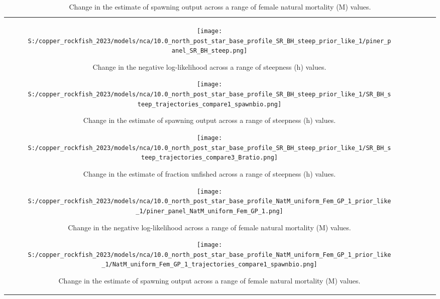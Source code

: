 \documentclass[11pt,
  letterpaper,
]{article}
\begin{document}
\begin{longtable}[t]{c>{\centering\arraybackslash}p{2cm}>{\centering\arraybackslash}p{2cm}>{\centering\arraybackslash}p{2cm}}
\pagebreak

\begin{figure}
{\centering
\texttt{[image: S:/copper\_rockfish\_2023/models/nca/10.0\_north\_post\_star\_base\_profile\_SR\_BH\_steep\_prior\_like\_1/piner\_panel\_SR\_BH\_steep.png]}
}
\caption{Change in the negative log-likelihood across a range of steepness (h) values.\label{fig:h-profile}}
\end{figure}

\pagebreak

\begin{figure}
{\centering
\texttt{[image: S:/copper\_rockfish\_2023/models/nca/10.0\_north\_post\_star\_base\_profile\_SR\_BH\_steep\_prior\_like\_1/SR\_BH\_steep\_trajectories\_compare1\_spawnbio.png]}
}
\caption{Change in the estimate of spawning output across a range of steepness (h) values.\label{fig:h-ssb}}
\end{figure}

\pagebreak

\begin{figure}
{\centering
\texttt{[image: S:/copper\_rockfish\_2023/models/nca/10.0\_north\_post\_star\_base\_profile\_SR\_BH\_steep\_prior\_like\_1/SR\_BH\_steep\_trajectories\_compare3\_Bratio.png]}
}
\caption{Change in the estimate of fraction unfished across a range of steepness (h) values.\label{fig:h-depl}}
\end{figure}

\pagebreak

\begin{figure}
{\centering
\texttt{[image: S:/copper\_rockfish\_2023/models/nca/10.0\_north\_post\_star\_base\_profile\_NatM\_uniform\_Fem\_GP\_1\_prior\_like\_1/piner\_panel\_NatM\_uniform\_Fem\_GP\_1.png]}
}
\caption{Change in the negative log-likelihood across a range of female natural mortality (M) values.\label{fig:m-profile}}
\end{figure}

\pagebreak

\begin{figure}
{\centering
\texttt{[image: S:/copper\_rockfish\_2023/models/nca/10.0\_north\_post\_star\_base\_profile\_NatM\_uniform\_Fem\_GP\_1\_prior\_like\_1/NatM\_uniform\_Fem\_GP\_1\_trajectories\_compare1\_spawnbio.png]}
}
\caption{Change in the estimate of spawning output across a range of female natural mortality (M) values.\label{fig:m-ssb}}
\end{figure}


\end{longtable}
\end{document}
